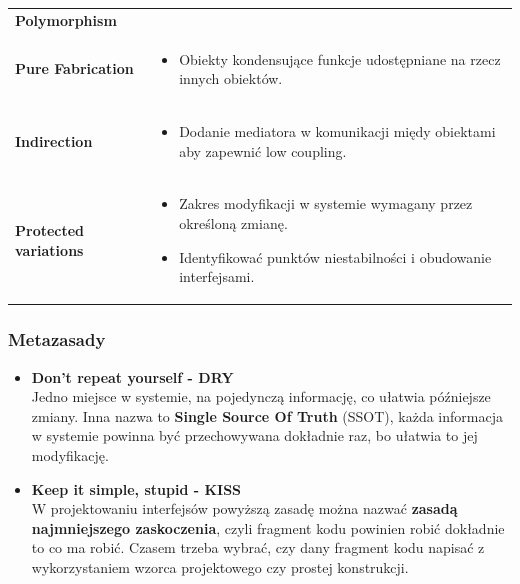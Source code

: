\documentclass[a4paper]{article}
\begin{document}
\begin{table}[H]
\begin{center}
\begin{tabular}{  p{3cm} p{12cm}  }
                \textbf{Polymorphism} & \\

                \textbf{Pure Fabrication}
                &
                \begin{itemize}
                    \item Obiekty kondensujące funkcje udostępniane na rzecz innych obiektów.
                \end{itemize}
                \\

                \textbf{Indirection}
                &
                \begin{itemize}
                    \item Dodanie mediatora w komunikacji międy obiektami aby zapewnić low coupling.
                \end{itemize}
                \\

                \textbf{Protected variations}
                &
                \begin{itemize}
                    \item Zakres modyfikacji w systemie
                    wymagany przez określoną zmianę.
                    \item Identyfikować punktów niestabilności i obudowanie interfejsami.
                \end{itemize}
            \end{tabular}
        \end{center}
    \end{table}


    \subsubsection{Metazasady}
    \begin{itemize}
        \item \textbf{Don't repeat yourself - DRY}\\
        Jedno miejsce w systemie, na pojedynczą informację, co ułatwia późniejsze zmiany.
        Inna nazwa to \textbf{Single Source Of Truth} (SSOT), każda informacja w systemie powinna być przechowywana
        dokładnie raz, bo ułatwia to jej modyfikację.
        \item \textbf{Keep it simple, stupid - KISS}\\
        W projektowaniu interfejsów powyższą zasadę można nazwać \textbf{zasadą najmniejszego zaskoczenia}, czyli
        fragment kodu powinien robić dokładnie to co ma robić. Czasem trzeba wybrać, czy dany fragment kodu
        napisać z wykorzystaniem wzorca projektowego czy prostej konstrukcji.
    \end{itemize}
\end{document}
